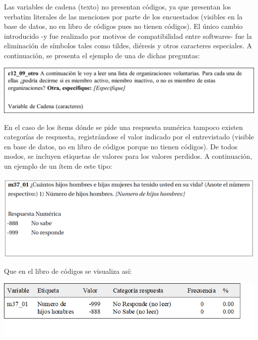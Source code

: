 \documentclass[
]{book}
\begin{document}
Las variables de cadena (texto) no presentan códigos, ya que presentan los verbatim literales de las menciones por parte de los encuestados (visibles en la base de datos, no en libro de códigos pues no tienen códigos). El único cambio introducido -y fue realizado por motivos de compatibilidad entre softwares- fue la eliminación de símbolos tales como tildes, diéresis y otros caracteres especiales. A continuación, se presenta el ejemplo de una de dichas preguntas:

\begin{center}\includegraphics[width=0.9\linewidth,height=0.9\textheight]{imagenes/c12_09_otro} \end{center}

En el caso de los ítems dónde se pide una respuesta numérica tampoco existen categorías de respuesta, registrándose el valor indicado por el entrevistado (visible en base de datos, no en libro de códigos porque no tienen códigos). De todos modos, se incluyen etiquetas de valores para los valores perdidos. A continuación, un ejemplo de un ítem de este tipo:

\begin{center}\includegraphics[width=0.9\linewidth,height=0.9\textheight]{imagenes/M37_01} \end{center}

Que en el libro de códigos se visualiza así:

\begin{center}\includegraphics[width=0.9\linewidth,height=0.9\textheight]{imagenes/m37_01_} \end{center}
\end{document}
